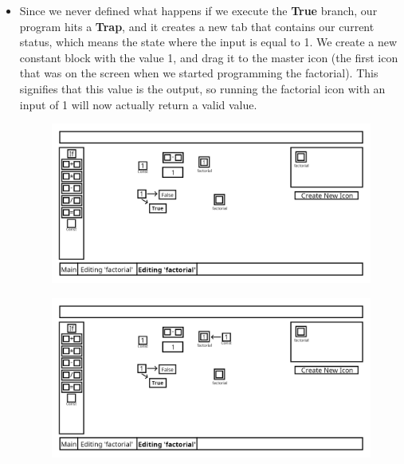 \documentclass{article}
\begin{document}
\begin{itemize}
            \item
                Since we never defined what happens if we execute the \textbf{True} branch, our program hits a \textbf{Trap},
                and it creates a new tab that contains our current status, which means the state where the input is equal to 1.
                We create a new constant block with the value 1, and drag it to the master icon (the first icon that was on
                the screen when we started programming the factorial). This signifies that this value is the output, so running
                the factorial icon with an input of 1 will now actually return a valid value.
                \begin{figure}[H]
                    \includegraphics[width=\textwidth]{include/example_factorial_hit_trap_1.png}
                    \centering
                \end{figure}
                \begin{figure}[H]
                    \includegraphics[width=\textwidth]{include/example_factorial_finish_true_branch.png}
                    \centering
                \end{figure}



\end{itemize}
\end{document}
